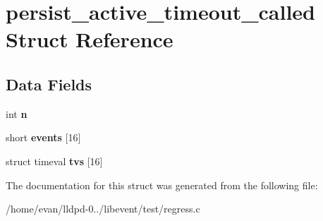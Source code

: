 \section{persist\-\_\-active\-\_\-timeout\-\_\-called \-Struct \-Reference}
\label{structpersist__active__timeout__called}
\subsection*{\-Data \-Fields}
\begin{DoxyCompactItemize}
\item 
int {\bfseries n}\label{structpersist__active__timeout__called_a76f11d9a0a47b94f72c2d0e77fb32240}

\item 
short {\bfseries events} [16]\label{structpersist__active__timeout__called_aec13da5488c3082daca949b1625b71fe}

\item 
struct timeval {\bfseries tvs} [16]\label{structpersist__active__timeout__called_ab78878da8c0b27f1faf3acefc90a5fd1}

\end{DoxyCompactItemize}


\-The documentation for this struct was generated from the following file\-:\begin{DoxyCompactItemize}
\item 
/home/evan/lldpd-\/0../libevent/test/regress.\-c\end{DoxyCompactItemize}
